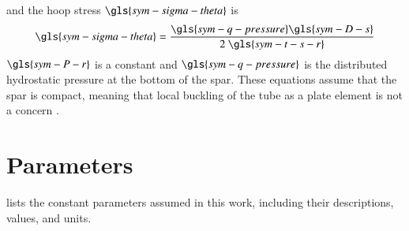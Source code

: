 and the hoop stress $\gls{sym-sigma-theta}$ is
\begin{equation}
     \gls{sym-sigma-theta} = \frac{
                                    \gls{sym-q-pressure}\gls{sym-D-s}
                                  }
                                  {
                                    2~\gls{sym-t-s-r}
                                  }
\end{equation}
$\gls{sym-P-r}$ is a constant and $\gls{sym-q-pressure}$ is the distributed hydrostatic pressure at the bottom of the spar.
These equations assume that the spar is compact,
meaning that local buckling of the tube as a plate element is not a concern \citep{american_bureau_of_shipping_requirements_2022}.



\section{Parameters}
\label{sec:appendix-parameters}
 lists the constant parameters assumed in this work, including their descriptions, values, and units.

